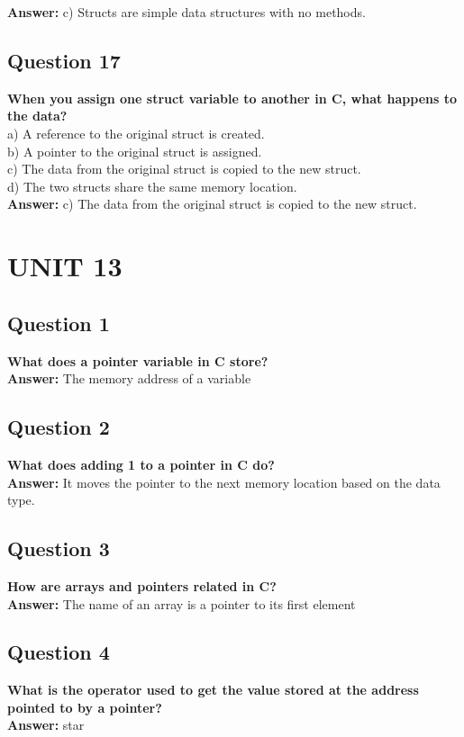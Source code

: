 \documentclass[11pt,parskip]{scrartcl}
\begin{document}
\textbf{Answer:} c) Structs are simple data structures with no methods.

\subsection*{Question 17}
\textbf{When you assign one struct variable to another in C, what happens to the data?} \\

a) A reference to the original struct is created. \\
b) A pointer to the original struct is assigned. \\
c) The data from the original struct is copied to the new struct. \\
d) The two structs share the same memory location. \\

\textbf{Answer:} c) The data from the original struct is copied to the new struct.

\section*{UNIT 13}

\subsection*{Question 1}
\textbf{What does a pointer variable in C store?} \\
\textbf{Answer:} The memory address of a variable

\subsection*{Question 2}
\textbf{What does adding 1 to a pointer in C do?} \\
\textbf{Answer:} It moves the pointer to the next memory location based on the data type.

\subsection*{Question 3}
\textbf{How are arrays and pointers related in C?} \\
\textbf{Answer:} The name of an array is a pointer to its first element

\subsection*{Question 4}
\textbf{What is the operator used to get the value stored at the address pointed to by a pointer?} \\
\textbf{Answer:} star
\end{document}
